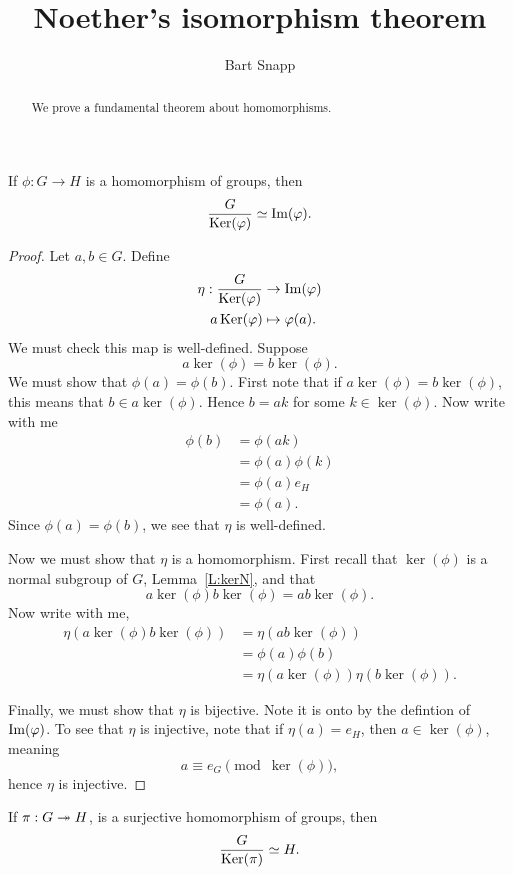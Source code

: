 \documentclass{ximera}
\author{Bart Snapp}
\title{Noether's isomorphism theorem}
\begin{document}
\begin{abstract}
  We prove a fundamental theorem about homomorphisms.
\end{abstract}
\maketitle

\begin{theorem}[Noether]\label{T:NI}
  If $\phi:G\to H$ is a homomorphism of groups, then
  \[
  \frac{G}{\mathop{\mathrm{Ker}}\nolimits(\varphi)} \simeq \operatorname{Im}(\varphi).
  \]
  \begin{proof}
    Let $a,b\in G$. Define
    \begin{align*}
      \eta: \frac{G}{\mathop{\mathrm{Ker}}\nolimits(\varphi)} &\to \operatorname{Im}(\varphi)\\
      a\mathop{\mathrm{Ker}}\nolimits(\varphi) &\mapsto \varphi(a).
    \end{align*}
    We must check this map is
    well-defined. Suppose
    \[
    a \ker(\phi) = b\ker(\phi).
    \]
    We must show that $\phi(a) = \phi(b)$. First note that if $a
    \ker(\phi) = b\ker(\phi)$, this means that $b\in
    a\ker(\phi)$. Hence $b = ak$ for some $k\in\ker(\phi)$. Now write
    with me
    \begin{align*}
      \phi(b) &=\phi(ak)\\
      &=\phi(a)\phi(k)\\
      &=\phi(a) e_H\\
      &=\phi(a).
    \end{align*}
    Since $\phi(a) = \phi(b)$, we see that $\eta$ is well-defined.


    
    Now we must show that $\eta$ is a homomorphism. First recall that
    $\ker(\phi)$ is a normal subgroup of $G$, Lemma~\ref{L:kerN}, and
    that
    \[
    a\ker(\phi) b\ker(\phi)  =  ab\ker(\phi).
    \]
    Now write with me, 
    \begin{align*}
    \eta(a\ker(\phi) b\ker(\phi)) &= \eta(ab\ker(\phi))\\
    &= \phi(a)\phi(b)\\
    &= \eta(a\ker(\phi)) \eta(b\ker(\phi)).
    \end{align*}



    Finally, we must show that $\eta$ is bijective. Note it is onto by
    the defintion of $\operatorname{Im}(\varphi)$.  To see that $\eta$ is injective,
    note that if $\eta(a) = e_H$, then $a\in \ker(\phi)$, meaning
    \[
    a\equiv e_G \pmod{\ker(\phi)},
    \]
    hence $\eta$ is injective. 
  \end{proof}
\end{theorem}

\begin{corollary}
  If $\pi:G\twoheadrightarrow H$, is a surjective homomorphism of groups, then
  \[
  \frac{G}{\mathop{\mathrm{Ker}}\nolimits(\pi)} \simeq H.
  \]
\end{corollary}
\end{document}
